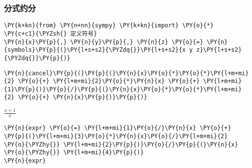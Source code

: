     \hypertarget{ux5206ux5f0fux7ea6ux5206}{%
\subsubsection{分式约分}\label{ux5206ux5f0fux7ea6ux5206}}

    \begin{tcolorbox}[breakable, size=fbox, boxrule=1pt, pad at break*=1mm,colback=cellbackground, colframe=cellborder]
\begin{Verbatim}[commandchars=\\\{\}]
\PY{k+kn}{from} \PY{n+nn}{sympy} \PY{k+kn}{import} \PY{o}{*}
\PY{c+c1}{\PYZsh{} 定义符号}
\PY{n}{x}\PY{p}{,} \PY{n}{y}\PY{p}{,} \PY{n}{z} \PY{o}{=} \PY{n}{symbols}\PY{p}{(}\PY{l+s+s2}{\PYZdq{}}\PY{l+s+s2}{x y z}\PY{l+s+s2}{\PYZdq{}}\PY{p}{)}
\end{Verbatim}
\end{tcolorbox}

    \begin{tcolorbox}[breakable, size=fbox, boxrule=1pt, pad at break*=1mm,colback=cellbackground, colframe=cellborder]
\begin{Verbatim}[commandchars=\\\{\}]
\PY{n}{cancel}\PY{p}{(}\PY{p}{(}\PY{n}{x}\PY{o}{*}\PY{o}{*}\PY{l+m+mi}{2} \PY{o}{+} \PY{l+m+mi}{2}\PY{o}{*}\PY{n}{x} \PY{o}{+} \PY{l+m+mi}{1}\PY{p}{)}\PY{o}{/}\PY{p}{(}\PY{n}{x}\PY{o}{*}\PY{o}{*}\PY{l+m+mi}{2} \PY{o}{+} \PY{n}{x}\PY{p}{)}\PY{p}{)}
\end{Verbatim}
\end{tcolorbox}
 
            
    
    $\displaystyle \frac{x + 1}{x}$

    

    \begin{tcolorbox}[breakable, size=fbox, boxrule=1pt, pad at break*=1mm,colback=cellbackground, colframe=cellborder]
\begin{Verbatim}[commandchars=\\\{\}]
\PY{n}{expr} \PY{o}{=} \PY{l+m+mi}{1}\PY{o}{/}\PY{n}{x} \PY{o}{+} \PY{p}{(}\PY{l+m+mi}{3}\PY{o}{*}\PY{n}{x}\PY{o}{/}\PY{l+m+mi}{2} \PY{o}{\PYZhy{}} \PY{l+m+mi}{2}\PY{p}{)}\PY{o}{/}\PY{p}{(}\PY{n}{x} \PY{o}{\PYZhy{}} \PY{l+m+mi}{4}\PY{p}{)}
\PY{n}{expr}
\end{Verbatim}
\end{tcolorbox}
 
